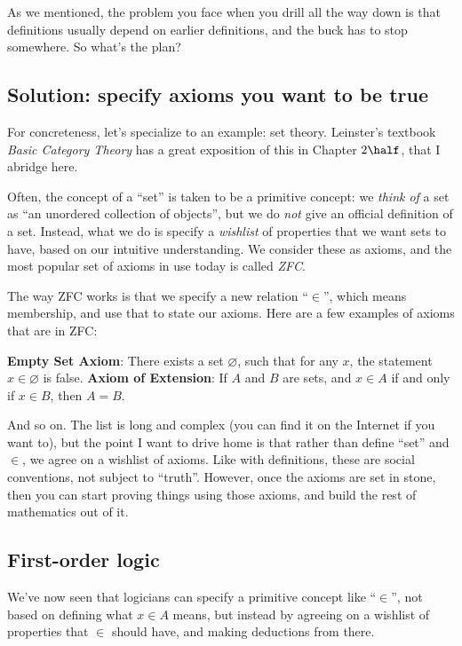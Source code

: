 \documentclass[11pt]{scrartcl}
\begin{document}
As we mentioned, the problem you face when you drill all the way down
is that definitions usually depend on earlier definitions,
and the buck has to stop somewhere. So what's the plan?

\subsection{Solution: specify axioms you want to be true}
For concreteness, let's specialize to an example: set theory.
Leinster's textbook \emph{Basic Category Theory} has a
great exposition of this in Chapter $2\half$, that I abridge here.

Often, the concept of a ``set'' is taken to be a primitive concept:
we \emph{think of} a set as ``an unordered collection of objects'',
but we do \emph{not} give an official definition of a set.
Instead, what we do is specify a \emph{wishlist} of properties that
we want sets to have, based on our intuitive understanding.
We consider these as axioms,
and the most popular set of axioms in use today is called \emph{ZFC}.

The way ZFC works is that we specify a new relation ``$\in$'',
which means membership, and use that to state our axioms.
Here are a few examples of axioms that are in ZFC:
\begin{itemize}
  \ii \textbf{Empty Set Axiom}:
  There exists a set $\varnothing$, such that for any $x$,
  the statement $x \in \varnothing$ is false.
  \ii \textbf{Axiom of Extension}:
  If $A$ and $B$ are sets, and $x \in A$ if and only if $x \in B$,
  then $A = B$.
\end{itemize}
And so on.
The list is long and complex (you can find it on the Internet if you want to),
but the point I want to drive home is that
\alert{rather than define ``set'' and $\in$, we agree on a wishlist of axioms}.
Like with definitions, these are social conventions, not subject to ``truth''.
However, once the axioms are set in stone,
then you can start proving things using those axioms,
and build the rest of mathematics out of it.

\subsection{First-order logic}
We've now seen that logicians can specify a primitive concept like ``$\in$'',
not based on defining what $x \in A$ means,
but instead by agreeing on a wishlist of properties that $\in$ should have,
and making deductions from there.
\end{document}
